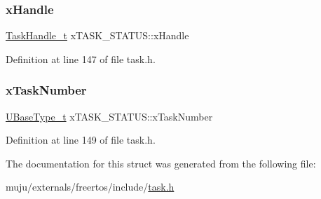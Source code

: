 \mbox{\label{structx_t_a_s_k___s_t_a_t_u_s_ac57f825f365c3c64bba827285fe3c2a0}} 
\subsubsection{\texorpdfstring{x\+Handle}{xHandle}}
{\footnotesize\ttfamily \hyperlink{externals_2freertos_2include_2task_8h_a25b35e6e19ecf894173e7ff95edb96ef}{Task\+Handle\+\_\+t} x\+T\+A\+S\+K\+\_\+\+S\+T\+A\+T\+U\+S\+::x\+Handle}



Definition at line 147 of file task.\+h.

\mbox{\label{structx_t_a_s_k___s_t_a_t_u_s_acd44468ba37270b04f83d0833c098057}} 
\subsubsection{\texorpdfstring{x\+Task\+Number}{xTaskNumber}}
{\footnotesize\ttfamily \hyperlink{externals_2freertos_2portable_2_g_c_c_2_a_r_m___c_m0_2portmacro_8h_a646f89d4298e4f5afd522202b11cb2e6}{U\+Base\+Type\+\_\+t} x\+T\+A\+S\+K\+\_\+\+S\+T\+A\+T\+U\+S\+::x\+Task\+Number}



Definition at line 149 of file task.\+h.



The documentation for this struct was generated from the following file\+:\begin{DoxyCompactItemize}
\item 
muju/externals/freertos/include/\hyperlink{externals_2freertos_2include_2task_8h}{task.\+h}\end{DoxyCompactItemize}
